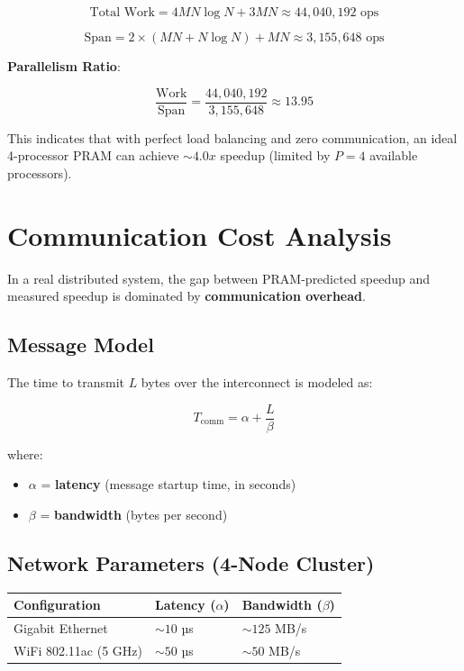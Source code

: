 \documentclass[11pt,a4paper]{article}
\theoremstyle{definition}
\begin{document}
\begin{equation}
\text{Total Work} = 4MN \log N + 3MN \approx 44{,}040{,}192 \text{ ops}
\end{equation}

\begin{equation}
\text{Span} = 2 \times (MN + N \log N) + MN \approx 3{,}155{,}648 \text{ ops}
\end{equation}

\textbf{Parallelism Ratio}:

\[
\frac{\text{Work}}{\text{Span}} = \frac{44{,}040{,}192}{3{,}155{,}648} \approx 13.95
\]

This indicates that with perfect load balancing and zero communication, an ideal 4-processor PRAM can achieve $\sim 4.0x$ speedup (limited by $P=4$ available processors).

\section{Communication Cost Analysis}

In a real distributed system, the gap between PRAM-predicted speedup and measured speedup is dominated by \textbf{communication overhead}.

\subsection{Message Model}

The time to transmit $L$ bytes over the interconnect is modeled as:

\[
T_{\text{comm}} = \alpha + \frac{L}{\beta}
\]

where:
\begin{itemize}
    \item $\alpha$ = \textbf{latency} (message startup time, in seconds)
    \item $\beta$ = \textbf{bandwidth} (bytes per second)
\end{itemize}

\subsection{Network Parameters (4-Node Cluster)}

\begin{table}[h]
    \centering
    \begin{tabular}{ll}
        \hline
        \textbf{Configuration} & \textbf{Latency ($\alpha$)} & \textbf{Bandwidth ($\beta$)} \\
        \hline
        Gigabit Ethernet & $\sim 10$ µs & $\sim 125$ MB/s \\
        WiFi 802.11ac (5 GHz) & $\sim 50$ µs & $\sim 50$ MB/s \\
        \hline
    \end{tabular}
\end{table}
\end{document}
